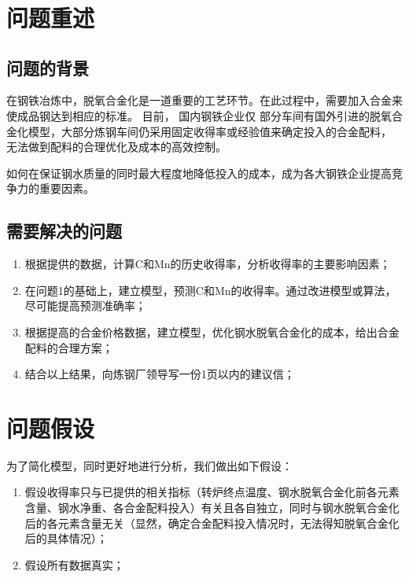 \documentclass[12pt]{article}%
\title{ \heiti\zihao{3}}
\author{}
\date{}
\begin{document}
\thispagestyle{empty}
\tableofcontents
\thispagestyle{empty}
\newpage

\setcounter{page}{1}
\section{问题重述}
\subsection{问题的背景}
在钢铁冶炼中，脱氧合金化是一道重要的工艺环节。在此过程中，需要加入合金来使成品钢达到相应的标准。
目前， 国内钢铁企业仅 部分车间有国外引进的脱氧合金化模型，大部分炼钢车间仍采用固定收得率或经验值来确定投入的合金配料，
无法做到配料的合理优化及成本的高效控制。

如何在保证钢水质量的同时最大程度地降低投入的成本，成为各大钢铁企业提高竞争力的重要因素。

\subsection{需要解决的问题}
\begin{enumerate}[问题1.]\addtolength{\itemsep}{-1.5ex}
\item 根据提供的数据，计算C和Mn的历史收得率，分析收得率的主要影响因素；
\item 在问题1的基础上，建立模型，预测C和Mn的收得率。通过改进模型或算法，尽可能提高预测准确率；
\item 根据提高的合金价格数据，建立模型，优化钢水脱氧合金化的成本，给出合金配料的合理方案；
\item 结合以上结果，向炼钢厂领导写一份1页以内的建议信；
\end{enumerate}

\section{问题假设}
为了简化模型，同时更好地进行分析，我们做出如下假设：
\begin{enumerate}[1.]\addtolength{\itemsep}{-1.5ex}
0且小于1的；
，钢水净重不发生大的改变。即认为钢水净重在投入合金配料前后质量不变；
\item 假设收得率只与已提供的相关指标（转炉终点温度、钢水脱氧合金化前各元素含量、钢水净重、各合金配料投入）有关且各自独立，同时与钢水脱氧合金化后的各元素含量无关（显然，确定合金配料投入情况时，无法得知脱氧合金化后的具体情况）；
\item 假设所有数据真实；
\end{enumerate}
\end{document}
